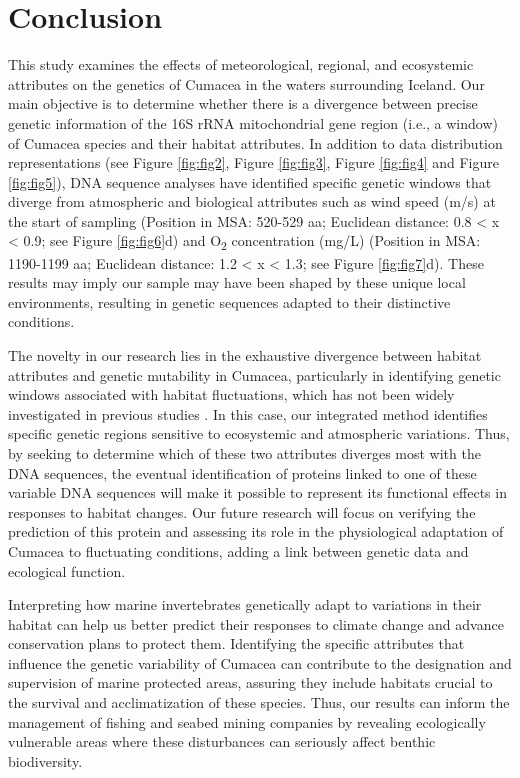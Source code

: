 {\section{Conclusion}\label{conclusion}
This study examines the effects of meteorological, regional, and ecosystemic attributes on the genetics of Cumacea in the waters surrounding Iceland. Our main objective is to determine whether there is a divergence between precise genetic information of the 16S rRNA mitochondrial gene region (i.e., a window) of Cumacea species and their habitat attributes. In addition to data distribution representations (see Figure \ref{fig:fig2}, Figure \ref{fig:fig3}, Figure \ref{fig:fig4} and Figure \ref{fig:fig5}), DNA sequence analyses have identified specific genetic windows that diverge from atmospheric and biological attributes such as wind speed (m/s) at the start of sampling (Position in MSA: 520-529 aa; Euclidean distance: 0.8 < x < 0.9; see Figure \ref{fig:fig6}d) and O\textsubscript{2} concentration (mg/L) (Position in MSA: 1190-1199 aa; Euclidean distance: 1.2 < x < 1.3; see Figure \ref{fig:fig7}d). These results may imply our sample may have been shaped by these unique local environments, resulting in genetic sequences adapted to their distinctive conditions.

The novelty in our research lies in the exhaustive divergence between habitat attributes and genetic mutability in Cumacea, particularly in identifying genetic windows associated with habitat fluctuations, which has not been widely investigated in previous studies \citep{manel2003landscape, vrijenhoek2009cryptic}. In this case, our integrated method identifies specific genetic regions sensitive to ecosystemic and atmospheric variations. Thus, by seeking to determine which of these two attributes diverges most with the DNA sequences, the eventual identification of proteins linked to one of these variable DNA sequences will make it possible to represent its functional effects in responses to habitat changes. Our future research will focus on verifying the prediction of this protein and assessing its role in the physiological adaptation of Cumacea to fluctuating conditions, adding a link between genetic data and ecological function.

Interpreting how marine invertebrates genetically adapt to variations in their habitat can help us better predict their responses to climate change and advance conservation plans to protect them. Identifying the specific attributes that influence the genetic variability of Cumacea can contribute to the designation and supervision of marine protected areas, assuring they include habitats crucial to the survival and acclimatization of these species. Thus, our results can inform the management of fishing and seabed mining companies by revealing ecologically vulnerable areas where these disturbances can seriously affect benthic biodiversity. 

}
